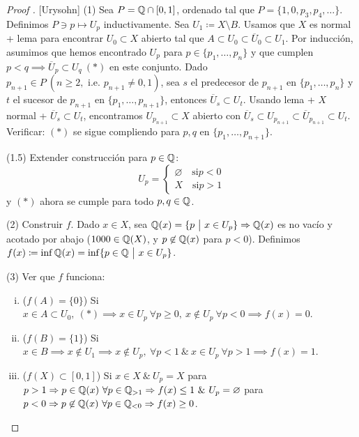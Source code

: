 \begin{proof}[Proof ][Urysohn]
	(1) Sea $P = \mathbb{Q} \cap [0,1]$, ordenado tal que $P = \{1,0,p_{3},p_{4},\dots\}$. Definimos $P \ni p \mapsto U_{p}$ inductivamente. Sea $U_{1} \coloneq X \setminus B$. Usamos que $X$ es normal + lema para encontrar $U_{0} \subset X$ abierto tal que $A \subset U_{0} \subset \overline{U}_{0} \subset U_{1}$. Por inducción, asumimos que hemos encontrado $U_{p}$ para $p \in \{p_{1},\dots,p_{n}\}$ y que cumplen $p < q \implies \overline{U}_{p} \subset U_{q} \ (*)$ en este conjunto. Dado $p_{n+1} \in P \ (n \geq 2,\text{ i.e. } p_{n+1} \neq 0,1)$, sea $s$ el predecesor de $p_{n+1}$ en $\{p_{1},\dots,p_{n}\}$ y $t$ el sucesor de $p_{n+1}$ en $\{p_{1},\dots,p_{n+1}\}$, entonces $\overline{U}_{s} \subset U_{t}$. Usando lema + $X$ normal + $\overline{U}_{s} \subset U_{t}$, encontramos $U_{p_{n+1}} \subset X$ abierto con $\overline{U}_{s} \subset U_{p_{n+1}} \subset \overline{U}_{p_{n+1}} \subset U_{t}$. Verificar: $(*)$ se sigue compliendo para $p,q$ en $\{p_{1},\dots,p_{n+1}\}$. \par
	\smallskip
	(1.5) Extender construcción para $p \in \mathbb{Q}$:
	\[ U_{p} = \begin{cases}
		\varnothing \quad \text{si} p < 0 \\
		X \quad \text{si} p > 1
	\end{cases} \]
	y $(*)$ ahora se cumple para todo $p,q \in \mathbb{Q}$. \par
	\smallskip
	(2) Construir $f$. Dado $x \in X$, sea $\mathbb{Q}(x) = \{p \ \big| \ x \in U_{p}\} \Rightarrow \mathbb{Q}(x)$ es no vacío y acotado por abajo ($1000 \in \mathbb{Q}(X)$, y $p \not\in \mathbb{Q}(x)$ para $p < 0$). Definimos $f(x) \coloneq \inf \mathbb{Q}(x) = \inf \{p \in \mathbb{Q} \ \big| \ x \in U_{p}\}$. \par
	\smallskip
	(3) Ver que $f$ funciona:
	\begin{enumerate}[i.]
		\item ($f(A) = \{0\}$) Si $x \in A \subset U_{0}, \ (*) \implies x \in U_{p} \ \forall p \geq 0,\ x \not\in U_{p} \ \forall p < 0 \implies f(x) = 0$.

		\item ($f(B) = \{1\}$) Si $x \in B \implies x \not\in U_{1} \implies x \not\in U_{p},\ \forall p < 1 \ \& \ x \in U_{p} \ \forall p > 1 \implies f(x) = 1$.

		\item ($f(X) \subset [0,1]$) Si $x \in X \ \& \ U_{p} = X$ para $p > 1 \Rightarrow p \in \mathbb{Q}(x) \ \forall p \in \mathbb{Q}_{> 1} \Rightarrow f(x) \leq 1 \ \& \ U_{p} = \varnothing$ para $p < 0 \Rightarrow p \not\in \mathbb{Q}(x) \ \forall p \in \mathbb{Q}_{< 0} \Rightarrow f(x) \geq 0$.


\end{enumerate}
\end{proof}

